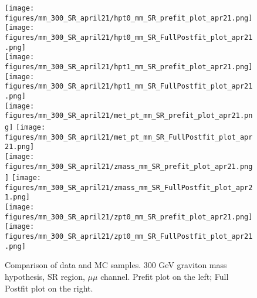 \begin{figure}[H]
\begin{center}
\texttt{[image: figures/mm\_300\_SR\_april21/hpt0\_mm\_SR\_prefit\_plot\_apr21.png]}
\texttt{[image: figures/mm\_300\_SR\_april21/hpt0\_mm\_SR\_FullPostfit\_plot\_apr21.png]}\\
\texttt{[image: figures/mm\_300\_SR\_april21/hpt1\_mm\_SR\_prefit\_plot\_apr21.png]}
\texttt{[image: figures/mm\_300\_SR\_april21/hpt1\_mm\_SR\_FullPostfit\_plot\_apr21.png]}\\
\texttt{[image: figures/mm\_300\_SR\_april21/met\_pt\_mm\_SR\_prefit\_plot\_apr21.png]}
\texttt{[image: figures/mm\_300\_SR\_april21/met\_pt\_mm\_SR\_FullPostfit\_plot\_apr21.png]}\\
\texttt{[image: figures/mm\_300\_SR\_april21/zmass\_mm\_SR\_prefit\_plot\_apr21.png]}
\texttt{[image: figures/mm\_300\_SR\_april21/zmass\_mm\_SR\_FullPostfit\_plot\_apr21.png]}\\
\texttt{[image: figures/mm\_300\_SR\_april21/zpt0\_mm\_SR\_prefit\_plot\_apr21.png]}
\texttt{[image: figures/mm\_300\_SR\_april21/zpt0\_mm\_SR\_FullPostfit\_plot\_apr21.png]}\\
\caption[Data-MC comparison in SR, other variables.]{Comparison of data and MC samples. 300 GeV graviton mass hypothesis, SR region, $\mu\mu$ channel. Prefit plot on the left; Full Postfit plot on the right.}
\label{MCcomparisons_mm_low_SR_2}
\end{center}
\end{figure}


